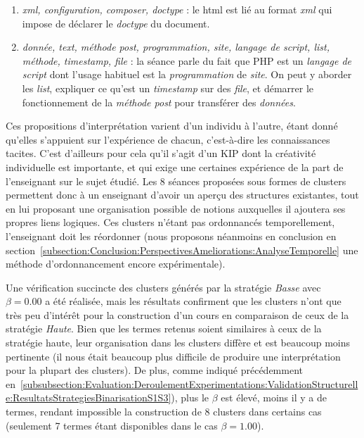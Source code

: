 \begin{enumerate}
\item \textit{xml, configuration, composer, doctype} : le html est lié au format \textit{xml} qui impose de déclarer le \textit{doctype} du document.

\item \textit{donnée, text, méthode post, programmation, site, langage de script, list, méthode, timestamp, file} : la séance parle du fait que PHP est un \textit{langage de script} dont l'usage habituel est la \textit{programmation} de \textit{site}. On peut y aborder les \textit{list}, expliquer ce qu'est un \textit{timestamp} sur des \textit{file}, et démarrer le fonctionnement de la \textit{méthode post} pour transférer des \textit{données}.
\end{enumerate}

\bigskip

Ces propositions d'interprétation varient d'un individu à l'autre, étant donné qu'elles s'appuient sur l'expérience de chacun, c'est-à-dire les connaissances tacites.
C'est d'ailleurs pour cela qu'il s'agit d'un KIP dont la créativité individuelle est importante, et qui exige une certaines expérience de la part de l'enseignant sur le sujet étudié.
Les 8 séances proposées sous formes de clusters permettent donc à un enseignant d'avoir un aperçu des structures existantes, tout en lui proposant une organisation possible de notions auxquelles il ajoutera ses propres liens logiques.
Ces clusters n'étant pas ordonnancés temporellement, l'enseignant doit les réordonner (nous proposons néanmoins en conclusion en section~\ref{subsection:Conclusion:PerspectivesAmeliorations:AnalyseTemporelle} une méthode d'ordonnancement encore expérimentale).

\bigskip

Une vérification succincte des clusters générés par la stratégie \textit{Basse} avec $ \beta = 0.00 $ a été réalisée, mais les résultats confirment que les clusters n'ont que très peu d'intérêt pour la construction d'un cours en comparaison de ceux de la stratégie \textit{Haute}.
Bien que les termes retenus soient similaires à ceux de la stratégie haute, leur organisation dans les clusters diffère et est beaucoup moins pertinente (il nous était beaucoup plus difficile de produire une interprétation pour la plupart des clusters).
De plus, comme indiqué précédemment en~\ref{subsubsection:Evaluation:DeroulementExperimentations:ValidationStructurelle:ResultatsStrategiesBinarisationS1S3}), plus le $ \beta $ est élevé, moins il y a de termes, rendant impossible la construction de 8 clusters dans certains cas (seulement 7 termes étant disponibles dans le cas $ \beta = 1.00 $).

